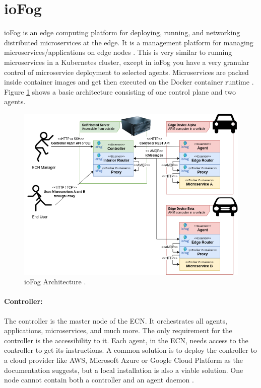 \newpage
\section{ioFog}
ioFog is an edge computing platform for deploying, running, and networking distributed microservices at the edge. It is a management platform for managing microservices/applications on edge nodes \cite{ioFogCoreConcepts}. This is very similar to running microservices in a Kubernetes cluster, except in ioFog you have a very granular control of microservice deployment to selected agents. Microservices are packed inside container images and get then executed on the Docker container runtime \cite{ioFogArchitecture}. Figure \ref{fig:iofog-ecn-architecture} shows a basic architecture consisting of one control plane and two agents.

\begin{figure}[H]
    \centering
    \includegraphics[width=\textwidth]{assets/iofog/iofog-architecture-ecn-router.png}
    \caption{ioFog Architecture \cite{ioFogArchitecture}.}\label{fig:iofog-ecn-architecture}
\end{figure}


\paragraph{Controller:} The controller is the master node of the \gls{ECN}. It orchestrates all agents, applications, microservices, and much more. The only requirement for the controller is the accessibility to it. Each agent, in the \gls{ECN}, needs access to the controller to get its instructions. A common solution is to deploy the controller to a cloud provider like \gls{AWS}, Microsoft Azure or Google Cloud Platform as the documentation suggests, but a local installation is also a viable solution. One node cannot contain both a controller and an agent daemon \cite{ioFogArchitecture}.

